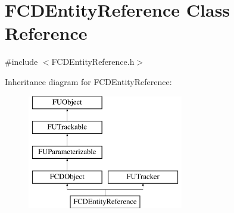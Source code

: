 \hypertarget{classFCDEntityReference}{
\section{FCDEntityReference Class Reference}
\label{classFCDEntityReference}
}


{\ttfamily \#include $<$FCDEntityReference.h$>$}

Inheritance diagram for FCDEntityReference:\begin{figure}[H]
\begin{center}
\leavevmode
\includegraphics[height=5.000000cm]{classFCDEntityReference}
\end{center}
\end{figure}
